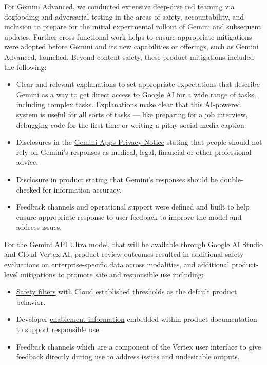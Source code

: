 For Gemini Advanced, we conducted extensive deep-dive red teaming via dogfooding and adversarial testing in the areas of safety, accountability, and inclusion to prepare for the initial experimental rollout of Gemini and subsequent updates. Further cross-functional work helps to ensure appropriate mitigations were adopted before Gemini and its new capabilities or offerings, such as Gemini Advanced, launched. Beyond content safety, these product mitigations included the following:
\begin{itemize}
\item Clear and relevant explanations to set appropriate expectations that describe Gemini as a way to get direct access to Google AI for a wide range of tasks, including complex tasks. Explanations make clear that this AI-powered system is useful for all sorts of tasks — like preparing for a job interview, debugging code for the first time or writing a pithy social media caption. 
\item Disclosures in the \href{https://support.google.com/gemini?p=privacy_notice}{Gemini Apps Privacy Notice} stating that people should not rely on Gemini’s responses as medical, legal, financial or other professional advice.
\item Disclosure in product stating that Gemini’s responses should be double-checked for information accuracy. 
\item Feedback channels and operational support were defined and built to help ensure appropriate response to user feedback to improve the model and address issues.
\end{itemize}

For the Gemini API Ultra model, that will be available through Google AI Studio and Cloud Vertex AI, product review outcomes resulted in additional safety evaluations on enterprise-specific data across modalities, and additional product-level mitigations to promote safe and responsible use including:
\begin{itemize}
\item \href{https://cloud.google.com/vertex-ai/docs/generative-ai/multimodal/configure-safety-attributes#safety_attribute_definitions}{Safety filters} with Cloud established thresholds as the default product behavior.
\item Developer \href{https://cloud.google.com/vertex-ai/docs/generative-ai/learn/responsible-ai}{enablement information} embedded within product documentation to support responsible use.
\item Feedback channels which are a component of the Vertex user interface to give feedback directly during use to address issues and undesirable outputs. 
\end{itemize}

